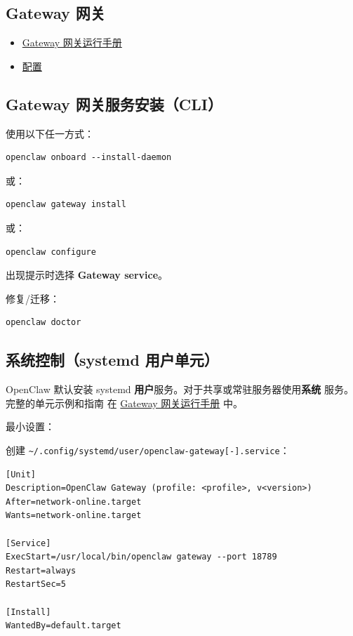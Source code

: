 \subsection{Gateway 网关}


\begin{itemize}
  \item \href{/gateway}{Gateway 网关运行手册}
  \item \href{/gateway/configuration}{配置}
\end{itemize}


\subsection{Gateway 网关服务安装（CLI）}


使用以下任一方式：

\begin{lstlisting}
openclaw onboard --install-daemon
\end{lstlisting}


或：

\begin{lstlisting}
openclaw gateway install
\end{lstlisting}


或：

\begin{lstlisting}
openclaw configure
\end{lstlisting}


出现提示时选择 \textbf{Gateway service}。

修复/迁移：

\begin{lstlisting}
openclaw doctor
\end{lstlisting}


\subsection{系统控制（systemd 用户单元）}


OpenClaw 默认安装 systemd \textbf{用户}服务。对于共享或常驻服务器使用\textbf{系统}
服务。完整的单元示例和指南
在 \href{/gateway}{Gateway 网关运行手册} 中。

最小设置：

创建 \texttt{\textasciitilde{}/.config/systemd/user/openclaw-gateway[-].service}：

\begin{lstlisting}
[Unit]
Description=OpenClaw Gateway (profile: <profile>, v<version>)
After=network-online.target
Wants=network-online.target

[Service]
ExecStart=/usr/local/bin/openclaw gateway --port 18789
Restart=always
RestartSec=5

[Install]
WantedBy=default.target
\end{lstlisting}


